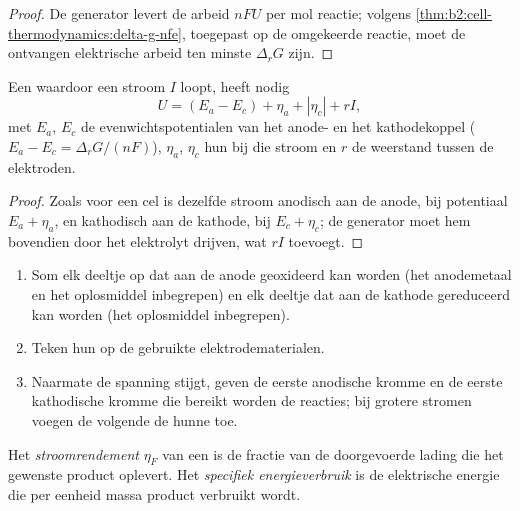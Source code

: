 \begin{proof}
De generator levert de arbeid $nFU$ per mol reactie; volgens
\cref{thm:b2:cell-thermodynamics:delta-g-nfe}, toegepast op de omgekeerde reactie, moet de
ontvangen elektrische arbeid ten minste $\Delta_r G$ zijn.
\end{proof}

\begin{proposition}\label{prop:b2:batteries-electrolysis:electrolysis-voltage}
Een  waardoor een stroom $I$ loopt, heeft nodig
\[
  U = (E_a - E_c) + \eta_a + |\eta_c| + rI ,
\]
met $E_a$, $E_c$ de evenwichtspotentialen van het anode- en het kathodekoppel
($E_a - E_c = \Delta_r G/(nF)$), $\eta_a$, $\eta_c$ hun  bij die
stroom en $r$ de weerstand tussen de elektroden.
\end{proposition}

\begin{proof}
Zoals voor een cel is dezelfde stroom anodisch aan de anode, bij potentiaal $E_a +
\eta_a$, en kathodisch aan de kathode, bij $E_c + \eta_c$; de generator moet hem bovendien
door het elektrolyt drijven, wat $rI$ toevoegt.
\end{proof}

\begin{method}\label{met:b2:batteries-electrolysis:predict-electrolysis}
\begin{enumerate}
  \item Som elk deeltje op dat aan de anode geoxideerd kan worden (het
        anodemetaal en het oplosmiddel inbegrepen) en elk deeltje dat aan
        de kathode gereduceerd kan worden (het oplosmiddel inbegrepen).
  \item Teken hun  op de gebruikte elektrodematerialen.
  \item Naarmate de spanning stijgt, geven de eerste anodische kromme en de eerste kathodische
        kromme die bereikt worden de reacties; bij grotere stromen voegen de volgende
        de hunne toe.
\end{enumerate}
\end{method}

\begin{definition}[Stroomrendement]\label{def:b2:batteries-electrolysis:faradaic-efficiency}
Het \emph{stroomrendement} $\eta_F$ van een
 is de fractie van de doorgevoerde lading die het gewenste
product oplevert. Het \emph{specifiek energieverbruik}
is de elektrische energie die per eenheid massa product verbruikt wordt.
\end{definition}

